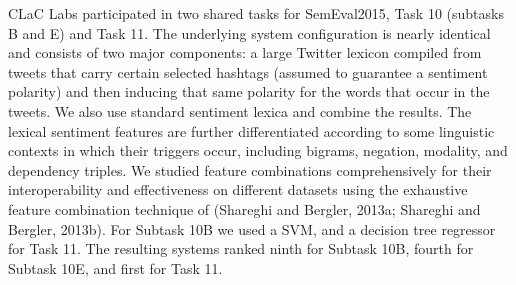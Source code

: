 CLaC Labs participated in two shared tasks for SemEval2015, Task 10 (subtasks B and E) and Task 11. The underlying system configuration is nearly identical and consists of two major components: a large Twitter lexicon compiled from tweets that carry certain selected hashtags (assumed to guarantee a sentiment polarity) and then inducing that same polarity for the words that occur in the tweets. We also use standard sentiment lexica and combine the results. The lexical sentiment features are further differentiated according to some linguistic contexts in which their triggers occur, including bigrams, negation, modality, and dependency triples. We studied feature combinations comprehensively for their interoperability and effectiveness on different datasets using the exhaustive feature combination technique of (Shareghi and Bergler, 2013a; Shareghi and Bergler, 2013b). For Subtask 10B we used a SVM, and a decision tree regressor for Task 11. The resulting systems ranked ninth for Subtask 10B, fourth for Subtask 10E, and first for Task 11.

